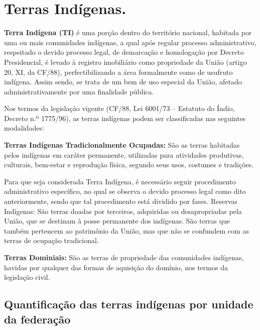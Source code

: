 \documentclass[
  letterpaper,
]{report}
\begin{document}
\n  

\n


\hypertarget{terras-induxedgenas.}{%
\chapter{Terras Indígenas.}\label{terras-induxedgenas.}}

\textbf{Terra Indígena (TI)} é uma porção dentro do território nacional,
habitada por uma ou mais comunidades indígenas, a qual após regular
processo administrativo, respeitado o devido processo legal, de
demarcação e homologação por Decreto Presidencial, é levado à registro
imobiliário como propriedade da União (artigo 20, XI, da CF/88),
perfectibilizando a área formalmente como de usufruto indígena. Assim
sendo, se trata de um bem de uso especial da União, afetado
administrativamente por uma finalidade pública.

Nos termos da legislação vigente (CF/88, Lei 6001/73 -- Estatuto do
Índio, Decreto n.º 1775/96), as terras indígenas podem ser classificadas
nas seguintes modalidades:

\textbf{Terras Indígenas Tradicionalmente Ocupadas:} São as terras
habitadas pelos indígenas em caráter permanente, utilizadas para
atividades produtivas, culturais, bem-estar e reprodução física, segundo
seus usos, costumes e tradições.

Para que seja considerada Terra Indígena, é necessário seguir
procedimento administrativo específico, no qual se observa o devido
processo legal como dito anteriormente, sendo que tal procedimento está
dividido por fases. Reservas Indígenas: São terras doadas por terceiros,
adquiridas ou desapropriadas pela União, que se destinam à posse
permanente dos indígenas. São terras que também pertencem ao patrimônio
da União, mas que não se confundem com as terras de ocupação
tradicional.

\textbf{Terras Dominiais:} São as terras de propriedade das comunidades
indígenas, havidas por qualquer das formas de aquisição do domínio, nos
termos da legislação civil.

\hypertarget{quantificauxe7uxe3o-das-terras-induxedgenas-por-unidade-da-federauxe7uxe3o}{%
\section{Quantificação das terras indígenas por unidade da
federação}\label{quantificauxe7uxe3o-das-terras-induxedgenas-por-unidade-da-federauxe7uxe3o}}
\end{document}
